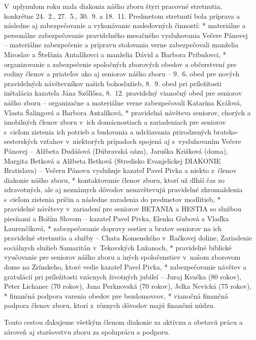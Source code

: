 V~uplynulom roku mala diakonia nášho zboru štyri pracovné stretnutia, konkrétne 24.~2., 27.~5., 30.~9. a 18.~11. Predmetom stretnutí bola príprava a následne aj zabezpečovanie a vykonávanie nasledovných činností:
\begitems
* materiálne a personálne zabezpečovanie pravidelného mesačného vysluhovania Večere Pánovej -- materiálne zabezpečenie a prípravu stolovania verne zabezpečovali manželia Miroslav a Štefánia Antalíkovci a manželia Dávid a Barbora Pribulovci,
* organizovanie a zabezpečenie spoločných zborových obedov a občerstvení pre rodiny členov a priateľov ako aj seniorov nášho zboru -- 9.~6. obed pre nových pravidelných návštevníkov našich bohoslužieb, 8.~9. obed pri príležitosti inštalácia kazateľa Jána Szőllősa, 8.~12. pravidelný vianočný obed pre seniorov nášho zboru -- organizačne a materiálne verne zabezpečovali Katarína Kráľová, Vlasta Šalingová a Barbora Antalíková,
* pravidelná návšteva seniorov, chorých a imobilných členov zboru v~ich domácnostiach a zariadeniach pre seniorov s~cieľom zistenia ich potrieb a budovania a udržiavania prirodzených bratsko-sesterských vzťahov v~niektorých prípadoch spojená aj s~vysluhovaním Večere Pánovej -- Alžbeta Dudášová (Dúbravská oáza), Jaruška Krišková (doma), Margita Betková a Alžbeta Betková (Stredisko Evanjelickej DIAKONIE Bratislava) -- Večeru Pánovu vysluhuje kazateľ Pavel Pivka a niekto z~členov diakonie nášho zboru,
* kontaktovanie členov zboru, ktorí už dlhší čas zo zdravotných, ale aj neznámych dôvodov nenavštevujú pravidelné zhromaždenia s~cieľom zistenia príčin a následne zaradenia do predmetov modlitieb,
* pravidelné návštevy v~zariadení pre seniorov BETANIA a HESTIA so službou piesňami a Božím Slovom -- kazateľ Pavel Pivka, Elenka Gubová a Vlaďka Laurenčíková,
* zabezpečovanie dopravy sestier a bratov seniorov na ich pravidelné stretnutia a služby -- Chata Komenského v~Račkovej doline, Zariadenie sociálnych služieb Samaritán v~Tekovských Lužanoch,
* pravidelné biblické vyučovanie pre seniorov nášho zboru a iných spoločenstiev v~našom zborovom dome na Zrínskeho, ktoré vedie kazateľ Pavel Pivka,
* zabezpečovanie návštev a gratulácií pri príležitosti vzácnych životných jubileí -- Juraj Kvačka (80 rokov), Peter Lichanec (70 rokov), Jana Perknovská (70 rokov), Jelka Nevická (75 rokov),
* finančná podpora varenia obedov pre bezdomovcov,
* vianočná finančná podpora členov zboru, ktorí z~rôznych dôvodov majú finančnú núdzu.
\enditems

Touto cestou ďakujeme všetkým členom diakonie za aktívnu a obetavú prácu a zároveň aj staršovstvu zboru za spoluprácu a podporu.

